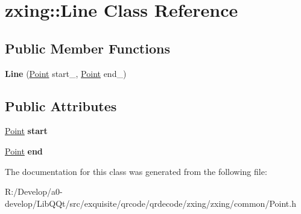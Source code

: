 \hypertarget{classzxing_1_1_line}{}\section{zxing\+:\+:Line Class Reference}
\label{classzxing_1_1_line}
\subsection*{Public Member Functions}
\begin{DoxyCompactItemize}
\item 
\mbox{\label{classzxing_1_1_line_a241d31a540db3896cc2562a4ef907c38}} 
{\bfseries Line} (\mbox{\hyperlink{classzxing_1_1_point}{Point}} start\+\_\+, \mbox{\hyperlink{classzxing_1_1_point}{Point}} end\+\_\+)
\end{DoxyCompactItemize}
\subsection*{Public Attributes}
\begin{DoxyCompactItemize}
\item 
\mbox{\label{classzxing_1_1_line_a22191928a44c18826af857d3138ba8ff}} 
\mbox{\hyperlink{classzxing_1_1_point}{Point}} {\bfseries start}
\item 
\mbox{\label{classzxing_1_1_line_ade67b8a2061de9cb67a5c5424babd756}} 
\mbox{\hyperlink{classzxing_1_1_point}{Point}} {\bfseries end}
\end{DoxyCompactItemize}


The documentation for this class was generated from the following file\+:\begin{DoxyCompactItemize}
\item 
R\+:/\+Develop/a0-\/develop/\+Lib\+Q\+Qt/src/exquisite/qrcode/qrdecode/zxing/zxing/common/Point.\+h\end{DoxyCompactItemize}
